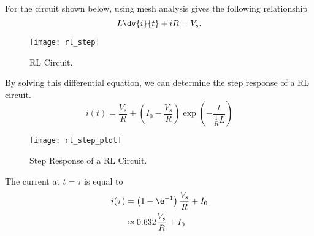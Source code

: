 \documentclass{article}
\begin{document}
\begin{definition}
    For the circuit shown below, using mesh analysis gives the following relationship
    \begin{equation*}
        L\dv{i}{t} + iR = V_s.
    \end{equation*}
    \begin{figure}[H]
        \centering
        \texttt{[image: rl\_step]}
        \caption{RL Circuit.}
    \end{figure}
    By solving this differential equation, we can determine the step response of a
    RL circuit.
    \begin{equation*}
        i(t) = \frac{V_s}{R} + \left(I_0 - \frac{V_s}{R}\right)\exp{\left( -\frac{t}{\frac{1}{R}L} \right)}
    \end{equation*}
    \begin{figure}[H]
        \centering
        \texttt{[image: rl\_step\_plot]}
        \caption{Step Response of a RL Circuit.}
    \end{figure}
    The current at $t=\tau$ is equal to
    \begin{align*}
        i(\tau) & = \left( 1 - \e^{-1} \right)\frac{V_s}{R} + I_0 \\
                & \approx 0.632\frac{V_s}{R} + I_0
    \end{align*}
\end{definition}
\newpage
\end{document}
